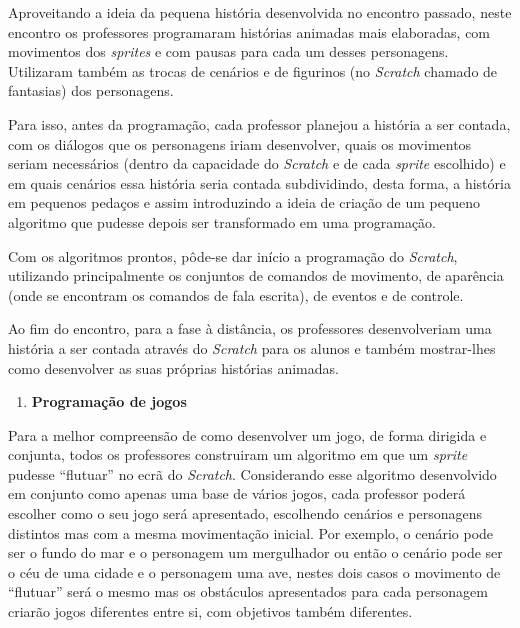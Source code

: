 \documentclass[12pt, openright, a4paper, brazil, english, french, spanish, bibjustif, openany, oneside]{abntex2}
\begin{document}
Aproveitando a ideia da pequena história desenvolvida no encontro passado, neste encontro os professores programaram histórias animadas mais elaboradas, com movimentos dos \textit{sprites} e com pausas para cada um desses personagens. Utilizaram também as trocas de cenários e de figurinos (no \textit{Scratch} chamado de fantasias) dos personagens.

Para isso, antes da programação, cada professor planejou a história a ser contada, com os diálogos que os personagens iriam desenvolver, quais os movimentos seriam necessários (dentro da capacidade do \textit{Scratch} e de cada \textit{sprite} escolhido) e em quais cenários essa história seria contada subdividindo, desta forma, a história em pequenos pedaços e assim introduzindo a ideia de criação de um pequeno algoritmo que pudesse depois ser transformado em uma programação.

Com os algoritmos prontos, pôde-se dar início a programação do \textit{Scratch}, utilizando principalmente os conjuntos de comandos de movimento, de aparência (onde se encontram os comandos de fala escrita), de eventos e de controle.

Ao fim do encontro, para a fase à distância, os professores desenvolveriam uma história a ser contada através do \textit{Scratch} para os alunos e também mostrar-lhes como desenvolver as suas próprias histórias animadas.

\begin{enumerate}[resume,label=\textbf{\arabic*.}]

\item \textbf{Programação de jogos}

\end{enumerate}

Para a melhor compreensão de como desenvolver um jogo, de forma dirigida e conjunta, todos os professores construiram um algoritmo em que um \textit{sprite} pudesse ``flutuar'' no ecrã do \textit{Scratch}. Considerando esse algoritmo desenvolvido em conjunto como apenas uma base de vários jogos, cada professor poderá escolher como o seu jogo será apresentado, escolhendo cenários e  personagens distintos mas com a mesma movimentação inicial. Por exemplo, o cenário pode ser  o fundo do mar e o personagem um mergulhador ou então o cenário pode ser o céu de uma cidade e o personagem uma ave, nestes dois casos o movimento de ``flutuar'' será o mesmo mas os obstáculos apresentados para cada personagem criarão jogos diferentes entre si, com objetivos também diferentes.
\end{document}
